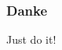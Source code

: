 \documentclass[table]{beamer}
\begin{document}
    
    \begin{frame}
        \frametitle{Danke}

        \begin{center}
            Just do it!
        \end{center}
    
    \end{frame}    
    
    
\end{document}
